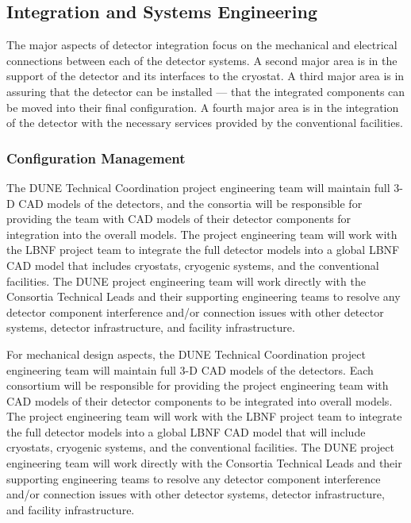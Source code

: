 \subsection{Integration and Systems Engineering }
\label{sec:fdsp-coord-integ-sysengr}

The major aspects of detector integration focus on the mechanical and
electrical connections between each of the detector systems. A second
major area is in the support of the detector and its interfaces to the
cryostat. A third major area is in assuring that the detector can be
installed --- that the integrated components can be moved into their
final configuration. A fourth major area is in the integration of the
detector with the necessary services provided by the conventional
facilities.

\subsubsection{Configuration Management}
\label{sec:fdsp-coord-integ-config}

The DUNE Technical Coordination project engineering team will maintain
full 3-D CAD models of the detectors, and the consortia will be
responsible for providing the team with CAD models of their detector
components for integration into the overall models.  The project
engineering team will work with the LBNF project team to integrate the
full detector models into a global LBNF CAD model that includes
cryostats, cryogenic systems, and the conventional facilities.  The
DUNE project engineering team will work directly with the Consortia
Technical Leads and their supporting engineering teams to resolve any
detector component interference and/or connection issues with other
detector systems, detector infrastructure, and facility
infrastructure.

For mechanical design aspects, the DUNE Technical Coordination project
engineering team will maintain full 3-D CAD models of the detectors.
Each consortium will be responsible for providing the project
engineering team with CAD models of their detector components to be
integrated into overall models.  The project engineering team will
work with the LBNF project team to integrate the full detector models
into a global LBNF CAD model that will include cryostats, cryogenic
systems, and the conventional facilities.  The DUNE project
engineering team will work directly with the Consortia Technical Leads
and their supporting engineering teams to resolve any detector
component interference and/or connection issues with other detector
systems, detector infrastructure, and facility infrastructure.


